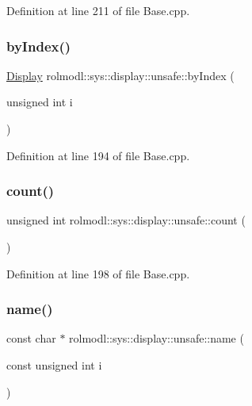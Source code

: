 Definition at line 211 of file Base.\+cpp.

\mbox{\label{namespacerolmodl_1_1sys_1_1display_1_1unsafe_a6821da893c862b8a0f3ac7e8a5a19010}} 
\subsubsection{\texorpdfstring{byIndex()}{byIndex()}}
{\footnotesize\ttfamily \mbox{\hyperlink{structrolmodl_1_1sys_1_1display_1_1_display}{Display}} rolmodl\+::sys\+::display\+::unsafe\+::by\+Index (\begin{DoxyParamCaption}\item[{unsigned int}]{i }\end{DoxyParamCaption})}



Definition at line 194 of file Base.\+cpp.

\mbox{\label{namespacerolmodl_1_1sys_1_1display_1_1unsafe_a9f4b025c26e8e10d6e8256b40c69d173}} 
\subsubsection{\texorpdfstring{count()}{count()}}
{\footnotesize\ttfamily unsigned int rolmodl\+::sys\+::display\+::unsafe\+::count (\begin{DoxyParamCaption}{ }\end{DoxyParamCaption})}



Definition at line 198 of file Base.\+cpp.

\mbox{\label{namespacerolmodl_1_1sys_1_1display_1_1unsafe_aed743db5c17811ec45e1212f729a4405}} 
\subsubsection{\texorpdfstring{name()}{name()}}
{\footnotesize\ttfamily const char $\ast$ rolmodl\+::sys\+::display\+::unsafe\+::name (\begin{DoxyParamCaption}\item[{const unsigned int}]{i }\end{DoxyParamCaption})}



